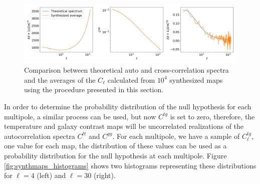 \documentclass[openany,a4paper,12pt,oneside]{book}
\begin{document}
\begin{spacing}{1.5}
\begin{figure}[!htb]
\centering
\includegraphics[width=\linewidth]{Imagens/Synth_TriplePlot.png}
\caption{Comparison between theoretical auto and cross-correlation spectra and the averages of the $C_\ell$ calculated from $10^4$ synthesized maps using the procedure presented in this section.}
\label{fig:SynthMaps_AvPlots}
\end{figure}

In order to determine the probability distribution of the null hypothesis for each multipole, a similar process can be used, but now $C^{tg}$ is set to zero, therefore, the temperature and galaxy contrast maps will be uncorrelated realizations of the autocorrelation spectra $C^{tt}$ and $C^{gg}$. For each multipole, we have a sample of $C^{tg}_\ell$, one value for each map, the distribution of these values can be used as a probability distribution for the null hypothesis at each multipole. Figure \ref{fig:synthmaps_histograms} shows two histograms representing these distributions for $\ell=4$ (left) and $\ell=30$ (right).


\end{spacing}
\end{document}
